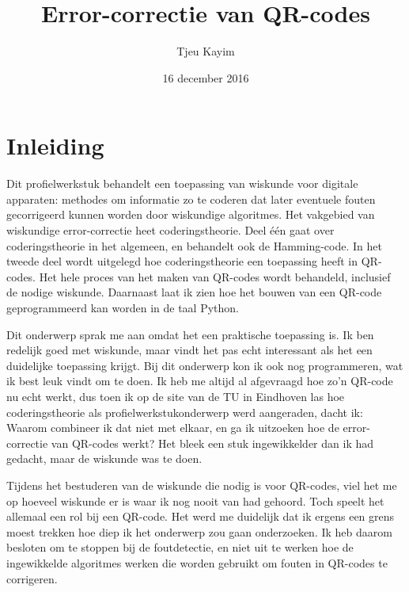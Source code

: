 \documentclass[a4paper]{article}
\title{Error-correctie van QR-codes}
\author{Tjeu Kayim}
\date{16 december 2016}
\begin{document}
\newcommand*\xor{\mathbin{\oplus}}
\def\blockms#1{\begin{minipage}{\linewidth} \texttt{#1}\end{minipage}}
\def\boldms#1{\texttt{\textbf{#1}}}



\maketitle
\tableofcontents
\newpage

\section{Inleiding}
Dit profielwerkstuk behandelt een toepassing van wiskunde voor digitale apparaten: methodes om informatie zo te coderen dat later eventuele fouten gecorrigeerd kunnen worden door wiskundige algoritmes. Het vakgebied van wiskundige error-correctie heet coderingstheorie. Deel één gaat over coderingstheorie in het algemeen, en behandelt ook de Hamming-code. In het tweede deel wordt uitgelegd hoe coderingstheorie een toepassing heeft in QR-codes. Het hele proces van het maken van QR-codes wordt behandeld, inclusief de nodige wiskunde. Daarnaast laat ik zien hoe het bouwen van een QR-code geprogrammeerd kan worden in de taal Python.

Dit onderwerp sprak me aan omdat het een praktische toepassing is. Ik ben redelijk goed met wiskunde, maar vindt het pas echt interessant als het een duidelijke toepassing krijgt. Bij dit onderwerp kon ik ook nog programmeren, wat ik best leuk vindt om te doen. Ik heb me altijd al afgevraagd hoe zo'n QR-code nu echt werkt, dus toen ik op de site van de TU in Eindhoven las hoe coderingstheorie als profielwerkstukonderwerp werd aangeraden, dacht ik: Waarom combineer ik dat niet met elkaar, en ga ik uitzoeken hoe de error-correctie van QR-codes werkt? Het bleek een stuk ingewikkelder dan ik had gedacht, maar de wiskunde was te doen.

Tijdens het bestuderen van de wiskunde die nodig is voor QR-codes, viel het me op hoeveel wiskunde er is waar ik nog nooit van had gehoord. Toch speelt het allemaal een rol bij een QR-code. Het werd me duidelijk dat ik ergens een grens moest trekken hoe diep ik het onderwerp zou gaan onderzoeken. Ik heb daarom besloten om te stoppen bij de foutdetectie, en niet uit te werken hoe de ingewikkelde algoritmes werken die worden gebruikt om fouten in QR-codes te corrigeren.
\end{document}
